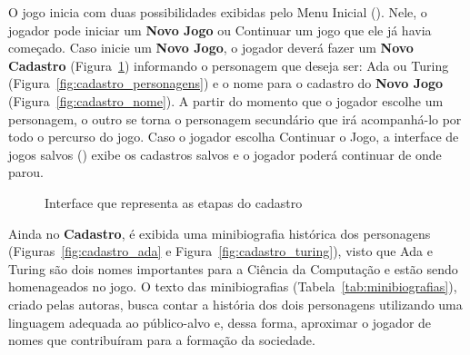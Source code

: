 O jogo inicia com duas possibilidades exibidas pelo Menu Inicial (). Nele, o jogador pode iniciar um \textbf{Novo Jogo} ou Continuar um jogo que ele já havia começado. Caso inicie um \textbf{Novo Jogo}, o jogador deverá fazer um \textbf{Novo Cadastro} (Figura~\ref{fig:cadastro}) informando o personagem que deseja ser: Ada ou Turing (Figura~\ref{fig:cadastro_personagens}) e o nome para o cadastro do \textbf{Novo Jogo} (Figura~\ref{fig:cadastro_nome}). A partir do momento que o jogador escolhe um personagem, o outro se torna o personagem secundário que irá acompanhá-lo por todo o percurso do jogo. Caso o jogador escolha Continuar o Jogo, a interface de jogos salvos () exibe os cadastros salvos e o jogador poderá continuar de onde parou.


\begin{figure}[H]
\centering
{}
\quad %
\quad %
\quad %
\caption{Interface que representa as etapas do cadastro}
\label{fig:cadastro}
\end{figure}


Ainda no \textbf{Cadastro}, é exibida uma minibiografia histórica dos personagens (Figuras~\ref{fig:cadastro_ada} e Figura~\ref{fig:cadastro_turing}), visto que Ada e Turing são dois nomes importantes para a Ciência da Computação e estão sendo homenageados no jogo. O texto das minibiografias (Tabela~\ref{tab:minibiografias}), criado pelas autoras, busca contar a história dos dois personagens utilizando uma linguagem adequada ao público-alvo e, dessa forma, aproximar o jogador de nomes que contribuíram para a formação da sociedade.

